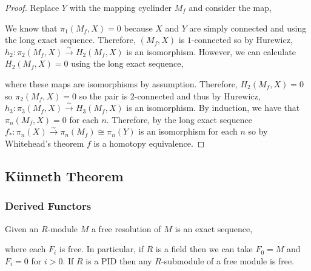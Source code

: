 \documentclass[12pt]{extarticle}
\begin{document}
\begin{proof}
Replace $Y$ with the mapping cyclinder $M_f$ and consider the map,
\begin{center}
\end{center}
We know that $\pi_1(M_f, X) = 0$ because $X$ and $Y$ are simply connected and using the long exact sequence. Therefore, $(M_f, X)$ is $1$-connected so by Hurewicz, $h_2 : \pi_2(M_f, X) \xrightarrow{\sim} H_2(M_f, X)$ is an isomorphism. However, we can calculate $H_2(M_f, X) = 0$ using the long exact sequence,
\begin{center}
\end{center}
where these maps are isomorphisms by assumption. Therefore, $H_2(M_f, X) = 0$ so $\pi_2(M_f, X) = 0$ so the pair is $2$-connected and thus by Hurewicz, $h_3 : \pi_3(M_f, X) \xrightarrow{\sim} H_3(M_f, X)$ is an isomorphism. By induction, we have that $\pi_n(M_f, X) = 0$ for each $n$. Therefore, by the long exact sequence $f_* : \pi_n(X) \xrightarrow{\sim} \pi_n(M_f) \cong \pi_n(Y)$ is an isomorphism for each $n$ so by Whitehead's theorem $f$ is a homotopy equivalence.
\end{proof}

 

\subsection{K\"{u}nneth Theorem}

\subsubsection{Derived Functors}

\begin{definition}
Given an $R$-module $M$ a free resolution of $M$ is an exact sequence,
\begin{center}
\end{center}
where each $F_i$ is free. In particular, if $R$ is a field then we can take $F_0 = M$ and $F_i = 0$ for $i > 0$. If $R$ is a PID then any $R$-submodule of a free module is free. 
\end{definition}
\end{document}
